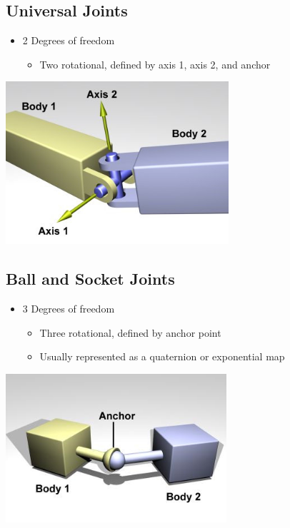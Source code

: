 \documentclass{article}
\begin{document}
\subsection*{Universal Joints}
\begin{itemize}
    \item 2 Degrees of freedom
    \begin{itemize}
        \item Two rotational, defined by axis 1, axis 2, and anchor
    \end{itemize}
\end{itemize}
\begin{center}
    \includegraphics*[scale=0.8]{W7_5.png}
\end{center}

\subsection*{Ball and Socket Joints}
\begin{itemize}
    \item 3 Degrees of freedom
    \begin{itemize}
        \item Three rotational, defined by anchor point
        \item Usually represented as a quaternion or exponential map
    \end{itemize}
\end{itemize}
\begin{center}
    \includegraphics*[scale=0.8]{W7_6.png}
\end{center}
\end{document}

